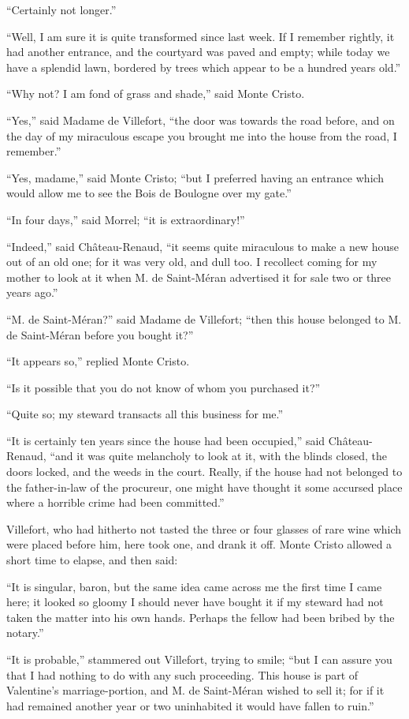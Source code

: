 “Certainly not longer.”

“Well, I am sure it is quite transformed since last week. If I remember
rightly, it had another entrance, and the courtyard was paved and
empty; while today we have a splendid lawn, bordered by trees which
appear to be a hundred years old.”

“Why not? I am fond of grass and shade,” said Monte Cristo.

“Yes,” said Madame de Villefort, “the door was towards the road before,
and on the day of my miraculous escape you brought me into the house
from the road, I remember.”

“Yes, madame,” said Monte Cristo; “but I preferred having an entrance
which would allow me to see the Bois de Boulogne over my gate.”

“In four days,” said Morrel; “it is extraordinary!”

“Indeed,” said Château-Renaud, “it seems quite miraculous to make a new
house out of an old one; for it was very old, and dull too. I recollect
coming for my mother to look at it when M. de Saint-Méran advertised it
for sale two or three years ago.”

“M. de Saint-Méran?” said Madame de Villefort; “then this house
belonged to M. de Saint-Méran before you bought it?”

“It appears so,” replied Monte Cristo.

“Is it possible that you do not know of whom you purchased it?”

“Quite so; my steward transacts all this business for me.”

“It is certainly ten years since the house had been occupied,” said
Château-Renaud, “and it was quite melancholy to look at it, with the
blinds closed, the doors locked, and the weeds in the court. Really, if
the house had not belonged to the father-in-law of the procureur, one
might have thought it some accursed place where a horrible crime had
been committed.”

Villefort, who had hitherto not tasted the three or four glasses of
rare wine which were placed before him, here took one, and drank it
off. Monte Cristo allowed a short time to elapse, and then said:

“It is singular, baron, but the same idea came across me the first time
I came here; it looked so gloomy I should never have bought it if my
steward had not taken the matter into his own hands. Perhaps the fellow
had been bribed by the notary.”

“It is probable,” stammered out Villefort, trying to smile; “but I can
assure you that I had nothing to do with any such proceeding. This
house is part of Valentine’s marriage-portion, and M. de Saint-Méran
wished to sell it; for if it had remained another year or two
uninhabited it would have fallen to ruin.”

